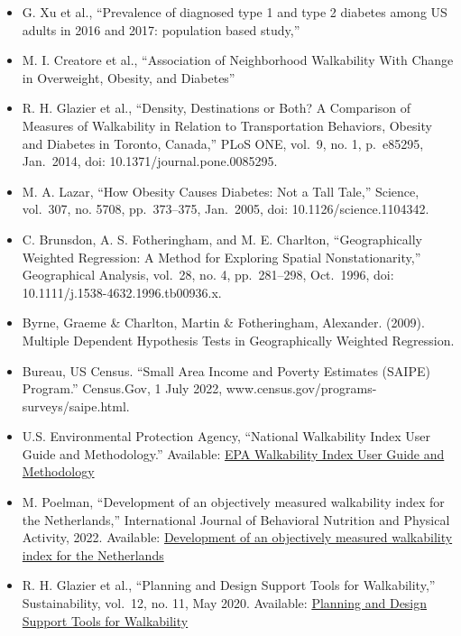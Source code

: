 \documentclass[
]{article}
\providecommand{\tightlist}{%
  \setlength{\itemsep}{0pt}\setlength{\parskip}{0pt}}\usepackage{longtable,booktabs,array}
\begin{document}
\begin{itemize}
\tightlist
\item
  G. Xu et al., ``Prevalence of diagnosed type 1 and type 2 diabetes
  among US adults in 2016 and 2017: population based study,''
\item
  M. I. Creatore et al., ``Association of Neighborhood Walkability With
  Change in Overweight, Obesity, and Diabetes''
\item
  R. H. Glazier et al., ``Density, Destinations or Both? A Comparison of
  Measures of Walkability in Relation to Transportation Behaviors,
  Obesity and Diabetes in Toronto, Canada,'' PLoS ONE, vol.~9, no. 1,
  p.~e85295, Jan.~2014, doi: 10.1371/journal.pone.0085295.
\item
  M. A. Lazar, ``How Obesity Causes Diabetes: Not a Tall Tale,''
  Science, vol.~307, no. 5708, pp.~373--375, Jan.~2005, doi:
  10.1126/science.1104342.
\item
  C. Brunsdon, A. S. Fotheringham, and M. E. Charlton, ``Geographically
  Weighted Regression: A Method for Exploring Spatial Nonstationarity,''
  Geographical Analysis, vol.~28, no. 4, pp.~281--298, Oct.~1996, doi:
  10.1111/j.1538-4632.1996.tb00936.x.
\item
  Byrne, Graeme \& Charlton, Martin \& Fotheringham, Alexander. (2009).
  Multiple Dependent Hypothesis Tests in Geographically Weighted
  Regression.
\item
  Bureau, US Census. ``Small Area Income and Poverty Estimates (SAIPE)
  Program.'' Census.Gov, 1 July 2022,
  www.census.gov/programs-surveys/saipe.html.
\item
  U.S. Environmental Protection Agency, ``National Walkability Index
  User Guide and Methodology.'' Available:
  \href{https://www.epa.gov/smartgrowth/national-walkability-index-user-guide-and-methodology}{EPA
  Walkability Index User Guide and Methodology}
\item
  M. Poelman, ``Development of an objectively measured walkability index
  for the Netherlands,'' International Journal of Behavioral Nutrition
  and Physical Activity, 2022. Available:
  \href{https://ijbnpa.biomedcentral.com/articles/10.1186/s12966-022-01270-8}{Development
  of an objectively measured walkability index for the Netherlands}
\item
  R. H. Glazier et al., ``Planning and Design Support Tools for
  Walkability,'' Sustainability, vol.~12, no. 11, May 2020. Available:
  \href{https://www.mdpi.com/2071-1050/12/11/4405}{Planning and Design
  Support Tools for Walkability}

\end{itemize}
\end{document}
